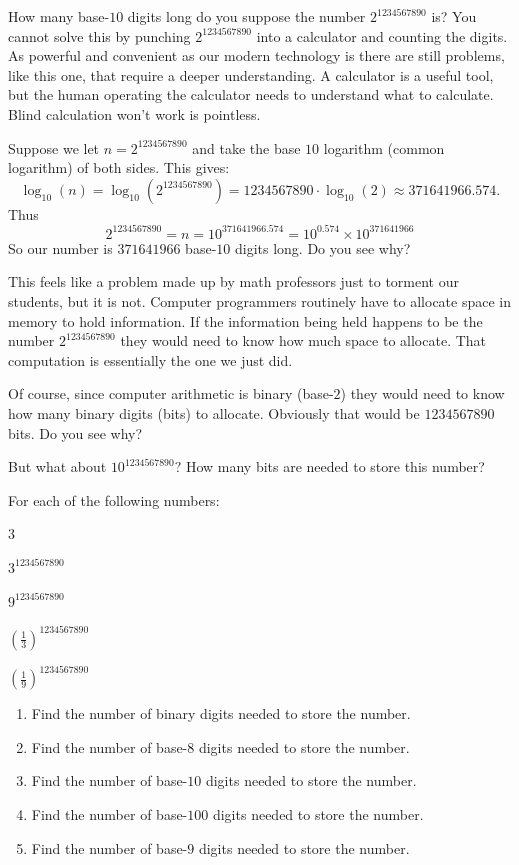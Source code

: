 \begin{embeddedproblem}
  How many base-$10$ digits long do you suppose the number
  $2^{1234567890}$ is? You cannot solve this by punching
  $2^{1234567890}$ into a calculator and counting the digits. As
  powerful and convenient as our modern technology is there are still
  problems, like this one, that require a deeper understanding. A
  calculator is a useful tool, but the human operating the
  calculator needs to understand what to calculate. Blind
  calculation won't work is pointless.

  Suppose we let $n = 2^{1234567890}$ and take the base $10$ logarithm
  (common logarithm) of both sides. This gives:
  $$
  \log_{10}(n)= \log_{10}(2^{1234567890})=1234567890\cdot
  \log_{10}(2)\approx371641966.574.
  $$
  Thus
  $$
  2^{1234567890}=n=10^{371641966.574}=10^{0.574}\times10^{371641966}
  $$
  So our number is $371641966$ base-$10$ digits long. Do you see why?

  This feels like a problem made up by math professors just to torment
  our students, but it is not. Computer programmers routinely have to
  allocate space in memory to hold information. If the information
  being held happens to be the number  $2^{1234567890}$ they would
  need to know how much space to allocate. That computation is
  essentially the one we just did.

  Of course, since computer arithmetic is binary (base-$2$) they would
  need to know how many binary digits (bits) to allocate. Obviously that
  would be $1234567890$ bits. Do you see why?

  But what about $10^{1234567890}?$ How many bits are needed to store
  this number?
\end{embeddedproblem}
  
\begin{embeddedproblem}
  For each of the following numbers:
  \begin{enumerate}[label={\bf{}(\roman*)}]
      \begin{multicols}{3}
      \item $3^{1234567890}$
      \item $9^{1234567890}$
      \item $\left(\frac13\right)^{1234567890}$
      \item $\left(\frac19\right)^{1234567890}$
      \end{multicols}
    \end{enumerate}
  \begin{enumerate}[label={\bf{}(\alph*)}]
    \item Find the number of binary digits needed to store the number.
    \item Find the number of base-$8 $ digits needed to store the number.
    \item Find the number of base-$10$ digits needed to store the number.
    \item Find the number of base-$100$ digits needed to store the number.
    \item Find the number of base-$9  $ digits needed to store the number.
  \end{enumerate}
\end{embeddedproblem}

